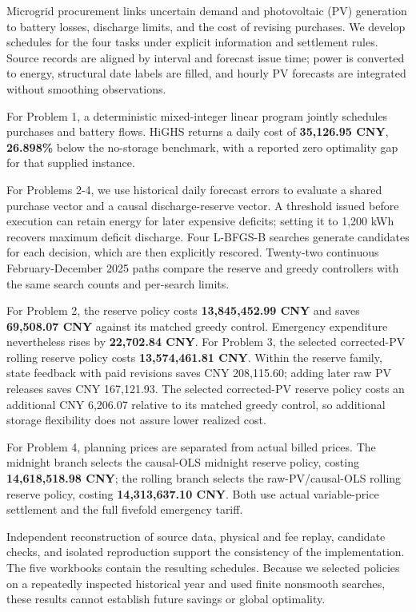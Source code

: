 Microgrid procurement links uncertain demand and photovoltaic (PV) generation to battery losses, discharge limits, and the cost of revising purchases. We develop schedules for the four tasks under explicit information and settlement rules. Source records are aligned by interval and forecast issue time; power is converted to energy, structural date labels are filled, and hourly PV forecasts are integrated without smoothing observations.

For Problem 1, a deterministic mixed-integer linear program jointly schedules purchases and battery flows. HiGHS returns a daily cost of \textbf{35,126.95 CNY}, \textbf{26.898\%} below the no-storage benchmark, with a reported zero optimality gap for that supplied instance.

For Problems 2-4, we use historical daily forecast errors to evaluate a shared purchase vector and a causal discharge-reserve vector. A threshold issued before execution can retain energy for later expensive deficits; setting it to 1,200 kWh recovers maximum deficit discharge. Four L-BFGS-B searches generate candidates for each decision, which are then explicitly rescored. Twenty-two continuous February-December 2025 paths compare the reserve and greedy controllers with the same search counts and per-search limits.

For Problem 2, the reserve policy costs \textbf{13,845,452.99 CNY} and saves \textbf{69,508.07 CNY} against its matched greedy control. Emergency expenditure nevertheless rises by \textbf{22,702.84 CNY}. For Problem 3, the selected corrected-PV rolling reserve policy costs \textbf{13,574,461.81 CNY}. Within the reserve family, state feedback with paid revisions saves CNY 208,115.60; adding later raw PV releases saves CNY 167,121.93. The selected corrected-PV reserve policy costs an additional CNY 6,206.07 relative to its matched greedy control, so additional storage flexibility does not assure lower realized cost.

For Problem 4, planning prices are separated from actual billed prices. The midnight branch selects the causal-OLS midnight reserve policy, costing \textbf{14,618,518.98 CNY}; the rolling branch selects the raw-PV/causal-OLS rolling reserve policy, costing \textbf{14,313,637.10 CNY}. Both use actual variable-price settlement and the full fivefold emergency tariff.

Independent reconstruction of source data, physical and fee replay, candidate checks, and isolated reproduction support the consistency of the implementation. The five workbooks contain the resulting schedules. Because we selected policies on a repeatedly inspected historical year and used finite nonsmooth searches, these results cannot establish future savings or global optimality.
